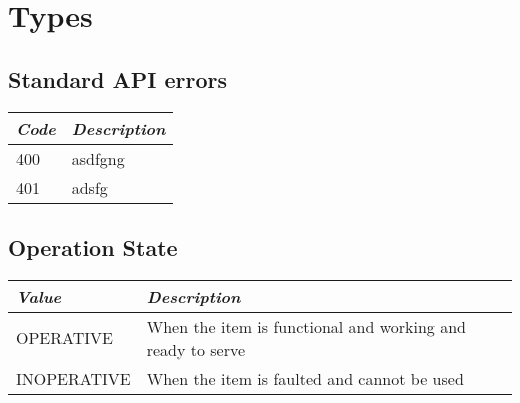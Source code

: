 \section{Types}

\subsection{Standard API errors}
\label{types:errors}

\begin{tabularx}{\linewidth}{ l X }
  \hline
  \textit{Code} & \textit{Description} \\
  \hline \hline
  400 		& asdfgng \\
  401 		& adsfg \\
\end{tabularx}


\subsection{Operation State}
\label{types:OperationState}

\begin{tabularx}{\linewidth}{ l X }
  \hline
  \textit{Value} & \textit{Description} \\
  \hline \hline
  OPERATIVE 		& When the item is functional and working and ready to serve \\
  INOPERATIVE 	& When the item is faulted and cannot be used \\
\end{tabularx}

%
